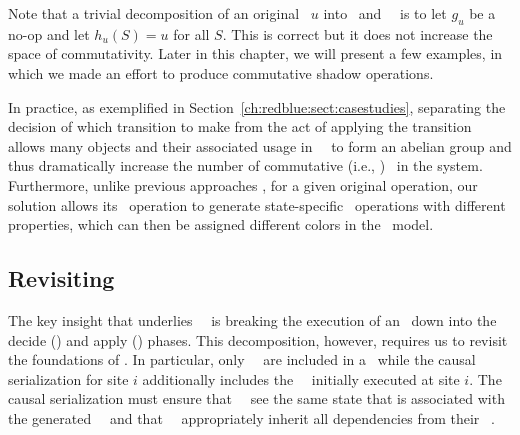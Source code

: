 Note that a trivial decomposition of an original \operation\ $u$ 
into \initial\ and \shadow\ \operations\ is to let $g_u$ be a no-op and let $h_u(S) = u$
for all $S$. This is correct but it does not increase the space
of commutativity. Later in this chapter, we will present a few
examples, in which we made an effort to produce commutative shadow operations.

In practice, as exemplified in Section~\ref{ch:redblue:sect:casestudies}, separating
the decision of which transition to make from the act of applying the
transition allows many objects and their associated usage in
\shadow\ \operations\ to form an abelian group and thus dramatically
increase the number of commutative (i.e., \blue) \operations\ in the
system. Furthermore, unlike previous approaches
\cite{Gray1996Dangers,Shapiro2011Conflict}, for a given
  original operation, our solution allows its \initial\ operation
to generate state-specific \shadow\ operations with different
properties, which can then be assigned different colors in the
\RBc\ model.

\subsection{Revisiting \RBc}
\label{sect:rbcimplications}
The key insight that underlies \shadow\ \operations\ is breaking
  the execution of an \operation\ down into the decide (\initial) and
  apply (\shadow) phases.  This decomposition, however, requires us to revisit the
  foundations of \RBc. In particular, only \shadow\ \operations\ are included in a
  \RBo\ while the causal serialization for site $i$ additionally includes the \initial\ \operations\ initially
  executed at site $i$. The causal serialization must ensure that
  \initial\ \operations\ see the same state that is associated with
  the generated \shadow\ \operation\ and that
  \shadow\ \operations\ appropriately inherit all dependencies from
  their \initial\ \operation.

